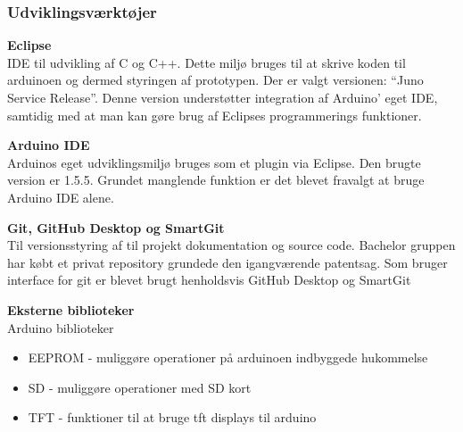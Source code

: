 \subsubsection{Udviklingsværktøjer}

\textbf{Eclipse} \\
IDE til udvikling af C og C++. Dette miljø bruges til at skrive koden til arduinoen og dermed styringen af prototypen. Der er valgt versionen: “Juno Service Release”. Denne version understøtter integration af Arduino’ eget IDE, samtidig med at man kan gøre brug af Eclipses programmerings funktioner.  

\textbf{Arduino IDE} \\
Arduinos eget udviklingsmiljø bruges som et plugin via Eclipse. Den brugte version er 1.5.5. Grundet manglende funktion er det blevet fravalgt at bruge Arduino IDE alene. 

\textbf{Git, GitHub Desktop og SmartGit} \\
Til versionsstyring af til projekt dokumentation og source code. Bachelor gruppen har købt et privat repository grundede den igangværende patentsag. Som bruger interface for git er blevet brugt henholdsvis GitHub Desktop og SmartGit

\textbf{Eksterne biblioteker} \\
Arduino biblioteker 
\begin{itemize}
\item EEPROM - muliggøre operationer på arduinoen indbyggede hukommelse
\item SD - muliggøre operationer med SD kort
\item TFT - funktioner til at bruge tft displays til arduino 
\end{itemize}


